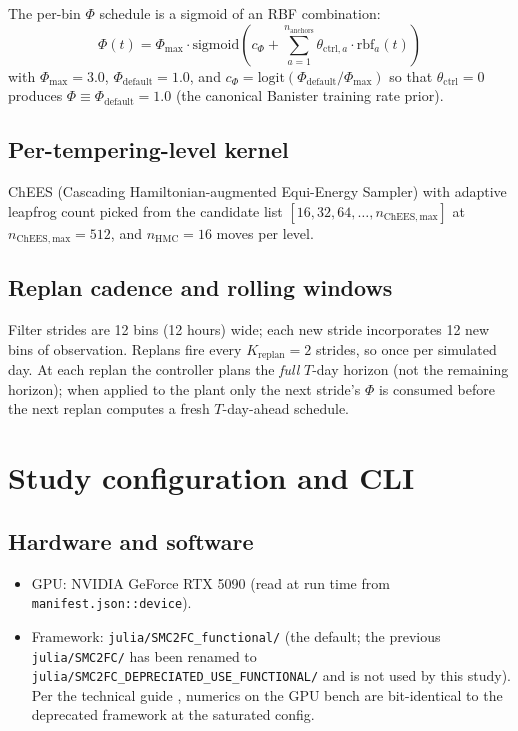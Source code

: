 \documentclass[11pt,a4paper]{article}
\begin{document}
The per-bin $\Phi$ schedule is a sigmoid of an RBF combination:
\begin{equation}
  \Phi(t) = \Phi_{\max} \cdot \mathrm{sigmoid}\!\left(c_\Phi
            + \sum_{a=1}^{n_{\mathrm{anchors}}} \theta_{\mathrm{ctrl},a}
              \cdot \mathrm{rbf}_a(t)\right)
\end{equation}
with $\Phi_{\max} = 3.0$, $\Phi_{\mathrm{default}} = 1.0$, and
$c_\Phi = \mathrm{logit}(\Phi_{\mathrm{default}} / \Phi_{\max})$ so
that $\theta_{\mathrm{ctrl}} = 0$ produces $\Phi \equiv
\Phi_{\mathrm{default}} = 1.0$ (the canonical Banister training rate
prior).

\subsection{Per-tempering-level kernel}

ChEES (Cascading Hamiltonian-augmented Equi-Energy Sampler) with
adaptive leapfrog count picked from the candidate list
$[16, 32, 64, \ldots, n_{\mathrm{ChEES,max}}]$ at
$n_{\mathrm{ChEES,max}} = 512$, and $n_{\mathrm{HMC}} = 16$ moves per
level.

\subsection{Replan cadence and rolling windows}

Filter strides are 12 bins (12 hours) wide; each new stride
incorporates 12 new bins of observation. Replans fire every
$K_{\mathrm{replan}} = 2$ strides, so once per simulated day. At each
replan the controller plans the \emph{full} $T$-day horizon (not the
remaining horizon); when applied to the plant only the next stride's
$\Phi$ is consumed before the next replan computes a fresh
$T$-day-ahead schedule.


\section{Study configuration and CLI}
\label{sec:cli}

\subsection{Hardware and software}

\begin{itemize}[itemsep=2pt]
  \item GPU: NVIDIA GeForce RTX 5090 (read at run time from
        \texttt{manifest.json::device}).
  \item Framework: \texttt{julia/SMC2FC\_functional/} (the default;
        the previous \texttt{julia/SMC2FC/} has been renamed to
        \texttt{julia/SMC2FC\_DEPRECIATED\_USE\_FUNCTIONAL/} and is
        not used by this study). Per the technical guide
        \cite{techguide}, numerics on the GPU bench are bit-identical
        to the deprecated framework at the saturated config.
\end{itemize}
\end{document}
